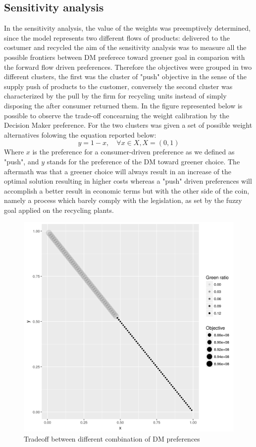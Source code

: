 \begin{doublespace}
\subsection{Sensitivity analysis}
In the sensitivity analysis, the value of the weights was preemptively determined, since the model represents two different flows of products: delivered to the costumer and recycled the aim of the sensitivity analysis was to measure all the possible frontiers between DM preferece toward greener goal in comparion with the forward flow driven preferences. Therefore the objectives were grouped in two different clusters, the first was the cluster of "push" objective in the sense of the supply push of products to the customer, conversely the second cluster was characterized by the pull by the firm for recycling units instead of simply disposing the after consumer returned them. In the figure represented below is possible to observe the trade-off concearning the weight calibration by the Decision Maker preference.
For the two clusters was given a set of possible weight alternatives folowing the equation reported below:
$$
y=1-x, \quad \forall x \in X, X = (0,1)
$$
Where $x$ is the preference for a consumer-driven preference as we defined as "push", and $y$ stands for the preference of the DM toward greener choice.
The aftermath was that a greener choice will always result in an increase of the optimal solution resulting in higher costs whereas a "push" driven preferences will accomplish a better result in economic terms but with the other side of the coin, namely a process which barely comply with the legislation, as set by the fuzzy goal applied on the recycling plants.
\begin{figure}[h]
\centering
\includegraphics[width=0.7\linewidth]{Images/tradeoff.png}
\caption{Tradeoff between different combination of DM preferences}
\end{figure}


\end{doublespace}
